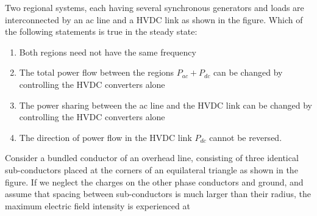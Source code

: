     \item Two regional systems, each having several synchronous generators and loads are interconnected by an ac line and a HVDC link as shown in the figure. Which of the following statements is true in the steady state:
	    \begin{figure}[!ht]
\centering
{}%
\end{figure}
\begin{enumerate}
    \item  Both regions need not have the same frequency 
\item The total power flow between the regions $P_{ac} + P_{dc}$ can be changed by controlling the HVDC converters alone 
\item The power sharing between the ac line and the HVDC link can be changed by controlling the HVDC converters alone 
\item The direction of power flow in the HVDC link $P_{dc}$ cannot be reversed.\\
\end{enumerate}
\item Consider a bundled conductor of an overhead line, consisting of three identical sub-conductors placed at the corners of an equilateral triangle as shown in the figure. If we neglect the charges on the other phase conductors and ground, and assume that spacing between sub-conductors is much larger than their radius, the maximum electric field intensity is experienced at
